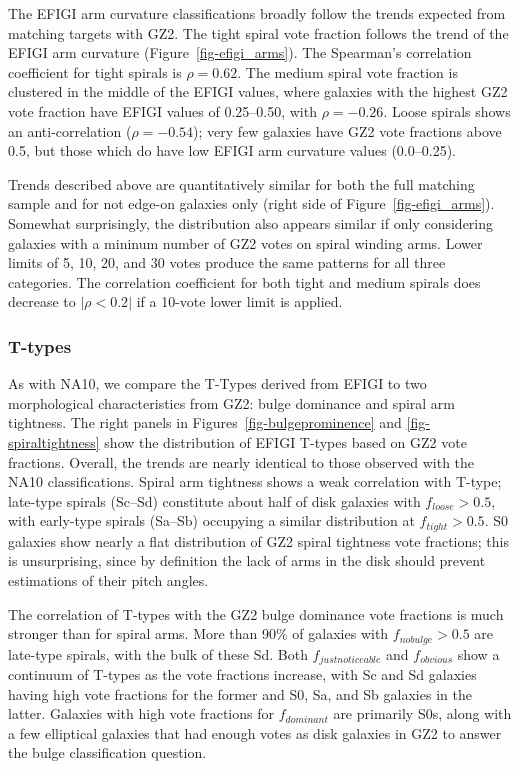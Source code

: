\documentclass[useAMS,usenatbib]{mn2e}
\begin{document}
The EFIGI arm curvature classifications broadly follow the trends expected from matching targets with GZ2. The tight spiral vote fraction follows the trend of the EFIGI arm curvature (Figure~\ref{fig-efigi_arms}). The Spearman's correlation coefficient for tight spirals is $\rho=0.62$. The medium spiral vote fraction is clustered in the middle of the EFIGI values, where galaxies with the highest GZ2 vote fraction have EFIGI values of 0.25--0.50, with $\rho=-0.26$. Loose spirals shows an anti-correlation ($\rho=-0.54$); very few galaxies have GZ2 vote fractions above 0.5, but those which do have low EFIGI arm curvature values (0.0--0.25). 

Trends described above are quantitatively similar for both the full matching sample and for not edge-on galaxies only (right side of Figure~\ref{fig-efigi_arms}). Somewhat surprisingly, the distribution also appears similar if only considering galaxies with a mininum number of GZ2 votes on spiral winding arms. Lower limits of 5, 10, 20, and 30 votes produce the same patterns for all three categories. The correlation coefficient for both tight and medium spirals does decrease to $|\rho<0.2|$ if a 10-vote lower limit is applied. 

\subsubsection{T-types}

As with NA10, we compare the T-Types derived from EFIGI to two morphological characteristics from GZ2: bulge dominance and spiral arm tightness. The right panels in Figures~\ref{fig-bulgeprominence} and \ref{fig-spiraltightness} show the distribution of EFIGI T-types based on GZ2 vote fractions. Overall, the trends are nearly identical to those observed with the NA10 classifications. Spiral arm tightness shows a weak correlation with T-type; late-type spirals (Sc--Sd) constitute about half of disk galaxies with $f_{loose}>0.5$, with early-type spirals (Sa--Sb) occupying a similar distribution at $f_{tight}>0.5$. S0 galaxies show nearly a flat distribution of GZ2 spiral tightness vote fractions; this is unsurprising, since by definition the lack of arms in the disk should prevent estimations of their pitch angles. 

The correlation of T-types with the GZ2 bulge dominance vote fractions is much stronger than for spiral arms. More than 90\% of galaxies with $f_{no bulge}>0.5$ are late-type spirals, with the bulk of these Sd. Both $f_{just noticeable}$ and $f_{obvious}$ show a continuum of T-types as the vote fractions increase, with Sc and Sd galaxies having high vote fractions for the former and S0, Sa, and Sb galaxies in the latter. Galaxies with high vote fractions for $f_{dominant}$ are primarily S0s, along with a few elliptical galaxies that had enough votes as disk galaxies in GZ2 to answer the bulge classification question. 
\end{document}
